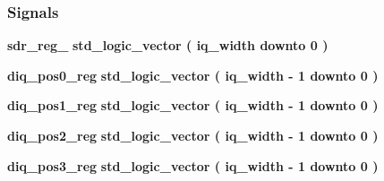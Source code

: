 \subsubsection*{Signals}
 \begin{DoxyCompactItemize}
\item 
{\bf sdr\+\_\+reg\+\_} {\bfseries \textcolor{comment}{std\+\_\+logic\+\_\+vector}\textcolor{vhdlchar}{ }\textcolor{vhdlchar}{(}\textcolor{vhdlchar}{ }\textcolor{vhdlchar}{ }\textcolor{vhdlchar}{ }\textcolor{vhdlchar}{ }{\bfseries {\bf iq\+\_\+width}} \textcolor{vhdlchar}{ }\textcolor{keywordflow}{downto}\textcolor{vhdlchar}{ }\textcolor{vhdlchar}{ } \textcolor{vhdldigit}{0} \textcolor{vhdlchar}{ }\textcolor{vhdlchar}{)}\textcolor{vhdlchar}{ }} 
\item 
{\bf diq\+\_\+pos0\+\_\+reg} {\bfseries \textcolor{comment}{std\+\_\+logic\+\_\+vector}\textcolor{vhdlchar}{ }\textcolor{vhdlchar}{(}\textcolor{vhdlchar}{ }\textcolor{vhdlchar}{ }\textcolor{vhdlchar}{ }\textcolor{vhdlchar}{ }{\bfseries {\bf iq\+\_\+width}} \textcolor{vhdlchar}{-\/}\textcolor{vhdlchar}{ } \textcolor{vhdldigit}{1} \textcolor{vhdlchar}{ }\textcolor{keywordflow}{downto}\textcolor{vhdlchar}{ }\textcolor{vhdlchar}{ } \textcolor{vhdldigit}{0} \textcolor{vhdlchar}{ }\textcolor{vhdlchar}{)}\textcolor{vhdlchar}{ }} 
\item 
{\bf diq\+\_\+pos1\+\_\+reg} {\bfseries \textcolor{comment}{std\+\_\+logic\+\_\+vector}\textcolor{vhdlchar}{ }\textcolor{vhdlchar}{(}\textcolor{vhdlchar}{ }\textcolor{vhdlchar}{ }\textcolor{vhdlchar}{ }\textcolor{vhdlchar}{ }{\bfseries {\bf iq\+\_\+width}} \textcolor{vhdlchar}{-\/}\textcolor{vhdlchar}{ } \textcolor{vhdldigit}{1} \textcolor{vhdlchar}{ }\textcolor{keywordflow}{downto}\textcolor{vhdlchar}{ }\textcolor{vhdlchar}{ } \textcolor{vhdldigit}{0} \textcolor{vhdlchar}{ }\textcolor{vhdlchar}{)}\textcolor{vhdlchar}{ }} 
\item 
{\bf diq\+\_\+pos2\+\_\+reg} {\bfseries \textcolor{comment}{std\+\_\+logic\+\_\+vector}\textcolor{vhdlchar}{ }\textcolor{vhdlchar}{(}\textcolor{vhdlchar}{ }\textcolor{vhdlchar}{ }\textcolor{vhdlchar}{ }\textcolor{vhdlchar}{ }{\bfseries {\bf iq\+\_\+width}} \textcolor{vhdlchar}{-\/}\textcolor{vhdlchar}{ } \textcolor{vhdldigit}{1} \textcolor{vhdlchar}{ }\textcolor{keywordflow}{downto}\textcolor{vhdlchar}{ }\textcolor{vhdlchar}{ } \textcolor{vhdldigit}{0} \textcolor{vhdlchar}{ }\textcolor{vhdlchar}{)}\textcolor{vhdlchar}{ }} 
\item 
{\bf diq\+\_\+pos3\+\_\+reg} {\bfseries \textcolor{comment}{std\+\_\+logic\+\_\+vector}\textcolor{vhdlchar}{ }\textcolor{vhdlchar}{(}\textcolor{vhdlchar}{ }\textcolor{vhdlchar}{ }\textcolor{vhdlchar}{ }\textcolor{vhdlchar}{ }{\bfseries {\bf iq\+\_\+width}} \textcolor{vhdlchar}{-\/}\textcolor{vhdlchar}{ } \textcolor{vhdldigit}{1} \textcolor{vhdlchar}{ }\textcolor{keywordflow}{downto}\textcolor{vhdlchar}{ }\textcolor{vhdlchar}{ } \textcolor{vhdldigit}{0} \textcolor{vhdlchar}{ }\textcolor{vhdlchar}{)}\textcolor{vhdlchar}{ }} 

\end{DoxyCompactItemize}
